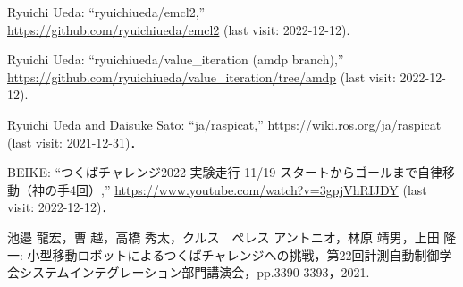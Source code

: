 \documentclass[twocolumn,9pt]{jsproceedings}
\begin{document}
\begin{thebibliography}{99}
Ryuichi Ueda: ``ryuichiueda/emcl2,''\\\url{https://github.com/ryuichiueda/emcl2} (last visit: 2022-12-12).

	Ryuichi Ueda: ``ryuichiueda/value\_iteration (amdp branch),''\\\url{https://github.com/ryuichiueda/value_iteration/tree/amdp} (last visit: 2022-12-12).

  Ryuichi Ueda and Daisuke Sato: ``ja/raspicat,'' \url{https://wiki.ros.org/ja/raspicat} (last visit: 2021-12-31)．
  
  BEIKE: ``つくばチャレンジ2022 実験走行 11/19 スタートからゴールまで自律移動（神の手4回）,'' \url{https://www.youtube.com/watch?v=3gpjVhRIJDY} (last visit: 2022-12-12)．

 池邉 龍宏，曹 越，高橋 秀太，クルス　ペレス アントニオ，林原 靖男，上田 隆一: 小型移動ロボットによるつくばチャレンジへの挑戦，第22回計測自動制御学会システムインテグレーション部門講演会，pp.3390-3393，2021.






  
  

\end{thebibliography}
\end{document}
